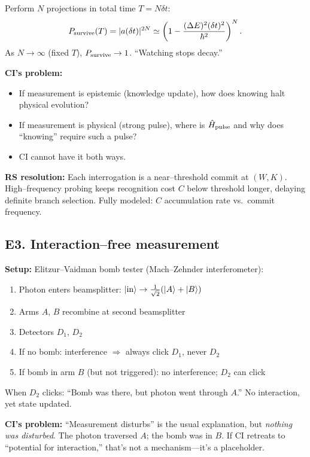 \documentclass[11pt]{article}
\begin{document}
Perform $N$ projections in total time $T=N\delta t$:
\begin{equation}
  P_{\rm survive}(T) = |a(\delta t)|^{2N} \simeq \left(1 - \frac{(\Delta E)^2(\delta t)^2}{\hbar^2}\right)^N.
\end{equation}
As $N\to\infty$ (fixed $T$), $P_{\rm survive}\to 1$. ``Watching stops decay.''

\textbf{CI's problem:}
\begin{itemize}[nosep]
  \item If measurement is epistemic (knowledge update), how does knowing halt physical evolution?
  \item If measurement is physical (strong pulse), where is $\hat H_{\rm pulse}$ and why does ``knowing'' require such a pulse?
  \item CI cannot have it both ways.
\end{itemize}

\textbf{RS resolution:}
Each interrogation is a near--threshold commit at $(W,K)$. High--frequency probing keeps recognition cost $C$ below threshold longer, delaying definite branch selection. Fully modeled: $C$ accumulation rate vs.\ commit frequency.

\subsection{E3. Interaction--free measurement}

\textbf{Setup:} Elitzur--Vaidman bomb tester (Mach--Zehnder interferometer):
\begin{enumerate}[nosep]
  \item Photon enters beamsplitter: $|{\rm in}\rangle \to \tfrac{1}{\sqrt{2}}(|A\rangle+|B\rangle)$
  \item Arms $A$, $B$ recombine at second beamsplitter
  \item Detectors $D_1$, $D_2$
  \item If no bomb: interference $\Rightarrow$ always click $D_1$, never $D_2$
  \item If bomb in arm $B$ (but not triggered): no interference; $D_2$ can click
\end{enumerate}

When $D_2$ clicks: ``Bomb was there, but photon went through $A$.'' No interaction, yet state updated.

\textbf{CI's problem:}
``Measurement disturbs'' is the usual explanation, but \emph{nothing was disturbed}. The photon traversed $A$; the bomb was in $B$. If CI retreats to ``potential for interaction,'' that's not a mechanism—it's a placeholder.
\end{document}
